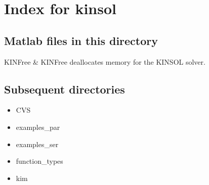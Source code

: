 \section{Index for {\sc kinsol}}

\subsection{Matlab files in this directory}

\begin{tabular}

KINFree & KINFree deallocates memory for the KINSOL solver.  \\
\end{tabular}


\subsection{Subsequent directories}

\begin{itemize}


\item CVS
\item examples_par
\item examples_ser
\item function_types
\item kim
\end{itemize}